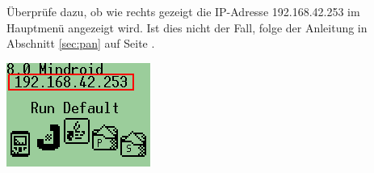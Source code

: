 \documentclass[
	12pt,
	article,
	type=bsc, %
	colorbacktitle,
	instlogo,
	accentcolor=tud1c,
	german,
	twoside
]{tudexercise}
\begin{document}
	
	\begin{enumerate}
	
	\begin{minipage}{.45\textwidth}
	\item Überprüfe dazu, ob wie rechts gezeigt die IP-Adresse 192.168.42.253 im Hauptmenü angezeigt wird. Ist dies nicht der Fall, folge der Anleitung in Abschnitt \ref{sec:pan} auf Seite \pageref{sec:pan}. 
	\end{minipage}
	\hspace{.05\textwidth}
	\begin{minipage}{.45\textwidth}
	\includegraphics[width=.8\textwidth]{img/ev3_main.png}
	\end{minipage}
	

\end{enumerate}
\end{document}
